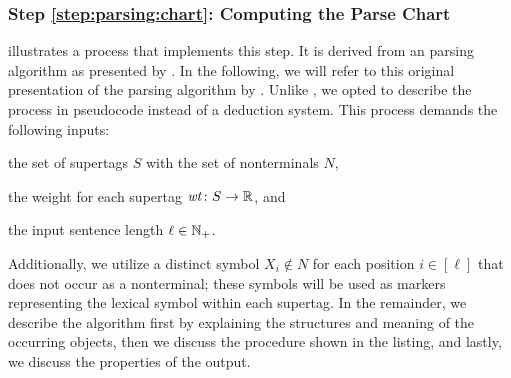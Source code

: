 \documentclass[../../document.tex]{subfiles}
\begin{document}
    \subsubsection*{Step \ref{step:parsing:chart}: Computing the Parse Chart}
     illustrates a process that implements this step.
    It is derived from an  parsing algorithm as presented by \citet[the na\"ive algorithm in Section~3]{Burden05}.
    In the following, we will refer to this original presentation of the parsing algorithm by .
    Unlike , we opted to describe the process in pseudocode instead of a deduction system.
    This process demands the following inputs:
    \begin{inparaitem}[]
        \item the set of  supertags \(S\) with the set of nonterminals \(N\),
        \item the weight for each supertag \(\mathit{wt}\colon S \to \mathbb{R}\), and
        \item the input sentence length \(\ell \in \mathbb{N}_+\).
    \end{inparaitem}
    Additionally, we utilize a distinct symbol \(X_i \notin N\) for each position \(i \in [\ell]\) that does not occur as a nonterminal; these symbols will be used as markers representing the lexical symbol within each supertag.
    In the remainder, we describe the algorithm first by explaining the structures and meaning of the occurring objects, then we discuss the procedure shown in the listing, and lastly, we discuss the properties of the output.
\end{document}
